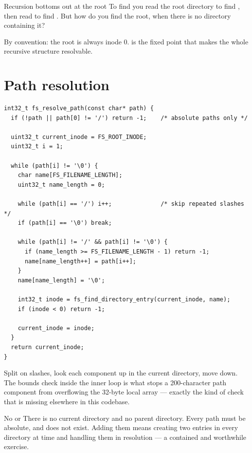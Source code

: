 \begin{concept}{Recursion bottoms out at the root}
To find  you read the root directory to find , then read  to find
. But how do you find the root, when there is no directory containing it?

By convention: the root is always inode 0.  is the fixed point that makes the
whole recursive structure resolvable.
\end{concept}

\section{Path resolution}

\begin{lstlisting}[style=c]
int32_t fs_resolve_path(const char* path) {
  if (!path || path[0] != '/') return -1;    /* absolute paths only */

  uint32_t current_inode = FS_ROOT_INODE;
  uint32_t i = 1;

  while (path[i] != '\0') {
    char name[FS_FILENAME_LENGTH];
    uint32_t name_length = 0;

    while (path[i] == '/') i++;              /* skip repeated slashes */
    if (path[i] == '\0') break;

    while (path[i] != '/' && path[i] != '\0') {
      if (name_length >= FS_FILENAME_LENGTH - 1) return -1;
      name[name_length++] = path[i++];
    }
    name[name_length] = '\0';

    int32_t inode = fs_find_directory_entry(current_inode, name);
    if (inode < 0) return -1;

    current_inode = inode;
  }
  return current_inode;
}
\end{lstlisting}

Split on slashes, look each component up in the current directory, move down. The bounds check
inside the inner loop is what stops a 200-character path component from overflowing the 32-byte
local array --- exactly the kind of check that is missing elsewhere in this codebase.

\begin{warn}{No  or }
There is no current directory and no parent directory. Every path must be absolute, and
 does not exist. Adding them means creating two entries in every directory at 
time and handling them in resolution --- a contained and worthwhile exercise.
\end{warn}

